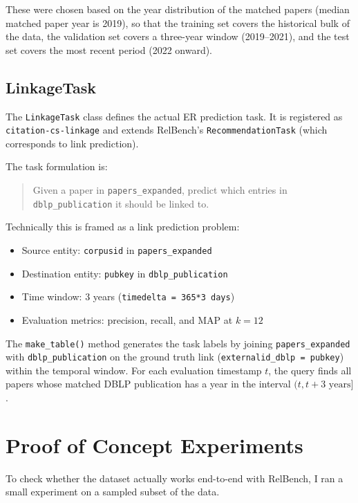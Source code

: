 \documentclass{article}
\begin{document}
These were chosen based on the year distribution of the matched papers (median matched paper year is 2019), so that the training set covers the historical bulk of the data, the validation set covers a three-year window (2019--2021), and the test set covers the most recent period (2022 onward).


\subsection{LinkageTask}

The \texttt{LinkageTask} class defines the actual ER prediction task.
It is registered as \texttt{citation-cs-linkage} and extends RelBench's \texttt{RecommendationTask} (which corresponds to link prediction).

The task formulation is:
\begin{quote}
Given a paper in \texttt{papers\_expanded}, predict which entries in \texttt{dblp\_publication} it should be linked to.
\end{quote}

Technically this is framed as a link prediction problem:
\begin{itemize}
    \item Source entity: \texttt{corpusid} in \texttt{papers\_expanded}
    \item Destination entity: \texttt{pubkey} in \texttt{dblp\_publication}
    \item Time window: 3 years (\texttt{timedelta = 365*3 days})
    \item Evaluation metrics: precision, recall, and MAP at $k=12$
\end{itemize}

The \texttt{make\_table()} method generates the task labels by joining \texttt{papers\_expanded} with \texttt{dblp\_publication} on the ground truth link (\texttt{externalid\_dblp = pubkey}) within the temporal window.
For each evaluation timestamp $t$, the query finds all papers whose matched DBLP publication has a year in the interval $(t, t + 3\text{ years}]$.


\section{Proof of Concept Experiments}
\label{sec:experiments}

To check whether the dataset actually works end-to-end with RelBench, I ran a small experiment on a sampled subset of the data.
\end{document}
